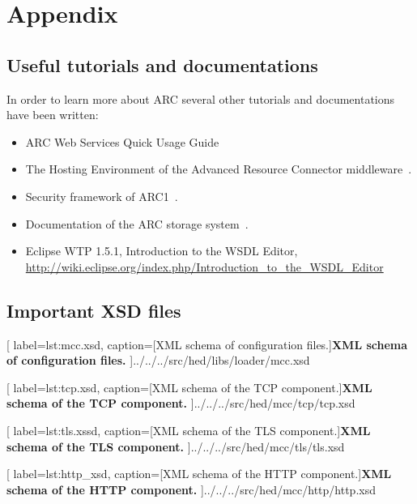 \chapter{Appendix}

\section{Useful tutorials and documentations}

In order to learn more about ARC several other tutorials and documentations have been written:
\begin{itemize}
 \item ARC Web Services Quick Usage Guide~\cite{2008_UNKNOWN}
 \item The Hosting Environment of the Advanced Resource Connector middleware~\cite{2008_Cameron}.
 \item Security framework of ARC1~\cite{QIANG_2008}.
 \item Documentation of the ARC storage system~\cite{Nagy_2008}.
 \item Eclipse WTP 1.5.1, Introduction to the WSDL Editor, \url{http://wiki.eclipse.org/index.php/Introduction_to_the_WSDL_Editor}


\end{itemize}




\section{Important XSD files}\label{sec:impXSD}


	[
	label=lst:mcc.xsd,
	caption={[XML schema of configuration files.]\textbf{XML schema of configuration files.}}
	]{../../../src/hed/libs/loader/mcc.xsd}


	[
	label=lst:tcp.xsd,
	caption={[XML schema of the TCP component.]\textbf{XML schema of the TCP component.}}
	]{../../../src/hed/mcc/tcp/tcp.xsd}


	[
	label=lst:tls.xssd,
	caption={[XML schema of the TLS component.]\textbf{XML schema of  the TLS component.}}
	]{../../../src/hed/mcc/tls/tls.xsd}


	[
	label=lst:http_xsd,
	caption={[XML schema of the HTTP component.]\textbf{XML schema of the HTTP component.}}
	]{../../../src/hed/mcc/http/http.xsd}










